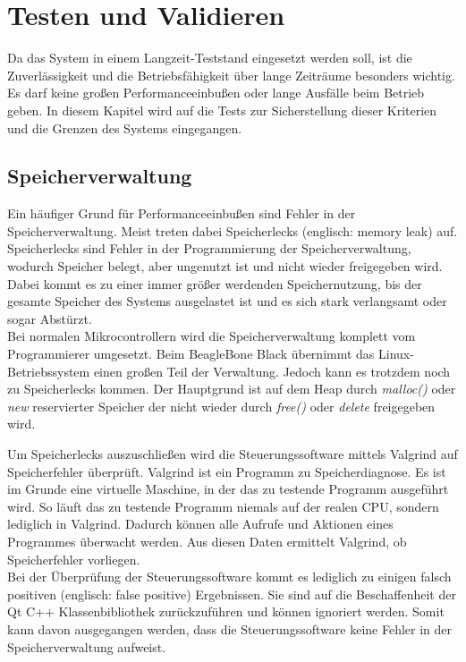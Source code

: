 
\chapter{Testen und Validieren}
\label{chapter_Testen_und_Validieren}

Da das System in einem Langzeit-Teststand eingesetzt werden soll, ist die Zuverlässigkeit und die Betriebsfähigkeit über lange Zeiträume besonders wichtig. Es darf keine großen Performanceeinbußen oder lange Ausfälle beim Betrieb geben. In diesem Kapitel wird auf die Tests zur Sicherstellung dieser Kriterien und die Grenzen des Systems eingegangen.

\section{Speicherverwaltung}

Ein häufiger Grund für Performanceeinbußen sind Fehler in der Speicherverwaltung. Meist treten dabei Speicherlecks (englisch: memory leak) auf.  Speicherlecks sind Fehler in der Programmierung der Speicherverwaltung, wodurch Speicher belegt, aber ungenutzt ist und nicht wieder freigegeben wird. Dabei kommt es zu einer immer größer werdenden Speichernutzung, bis der gesamte Speicher des Systems ausgelastet ist und es sich stark verlangsamt oder sogar Abstürzt.\\
Bei normalen Mikrocontrollern wird die Speicherverwaltung komplett vom Programmierer umgesetzt. Beim BeagleBone Black  übernimmt das Linux-Betriebssystem einen großen Teil der Verwaltung. Jedoch kann es trotzdem noch zu Speicherlecks kommen. Der Hauptgrund ist auf dem Heap durch \textit{malloc()} oder \textit{new} reservierter Speicher der nicht wieder durch \textit{free()} oder \textit{delete} freigegeben wird.\ 
  
Um Speicherlecks auszuschließen wird die Steuerungssoftware mittels Valgrind \cite{valgrind} auf Speicherfehler überprüft. Valgrind ist ein Programm zu Speicherdiagnose. Es ist im Grunde eine virtuelle Maschine, in der das zu testende Programm ausgeführt wird. So läuft das zu testende Programm niemals auf der realen CPU, sondern lediglich in Valgrind. Dadurch können alle Aufrufe und Aktionen eines Programmes überwacht werden. Aus diesen Daten ermittelt Valgrind, ob Speicherfehler vorliegen.\\
Bei der Überprüfung der Steuerungssoftware kommt es lediglich zu einigen falsch positiven (englisch: false positive) Ergebnissen. Sie sind auf die Beschaffenheit der Qt C++ Klassenbibliothek zurückzuführen und können ignoriert werden. Somit kann davon ausgegangen werden, dass die Steuerungssoftware keine Fehler in der Speicherverwaltung aufweist.\\

